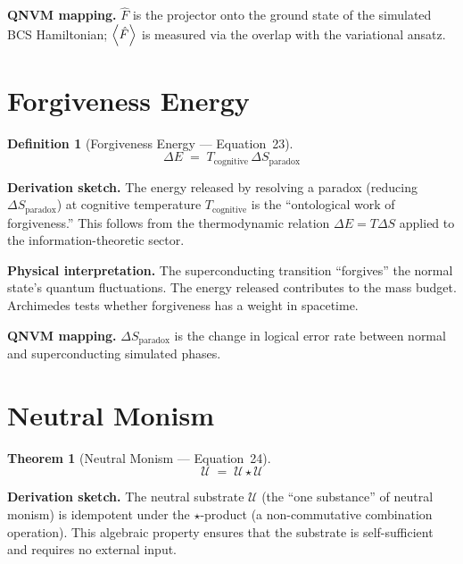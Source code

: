 \documentclass[11pt,a4paper]{article}
\newtheorem{definition}{Definition}[section]
\newtheorem{theorem}{Theorem}[section]
\theoremstyle{remark}
\newcommand{\Fop}{\hat{F}}
\newcommand{\CalU}{\mathcal{U}}
\begin{document}
\textbf{QNVM mapping.}\quad
$\Fop$ is the projector onto the ground state of the simulated BCS Hamiltonian; $\expval{\Fop}$ is measured via the overlap with the variational ansatz.

\section{Forgiveness Energy}
\label{sec:eq23}

\begin{definition}[Forgiveness Energy --- Equation~23]
\begin{equation}\label{eq:forgive}
    \Delta E \;=\; T_{\text{cognitive}}\, \Delta S_{\text{paradox}}
\end{equation}
\end{definition}

\textbf{Derivation sketch.}\quad
The energy released by resolving a paradox (reducing $\Delta S_{\text{paradox}}$) at cognitive temperature $T_{\text{cognitive}}$ is the ``ontological work of forgiveness.''  This follows from the thermodynamic relation $\Delta E = T\Delta S$ applied to the information-theoretic sector.

\textbf{Physical interpretation.}\quad
The superconducting transition ``forgives'' the normal state's quantum fluctuations.  The energy released contributes to the mass budget.  Archimedes tests whether forgiveness has a weight in spacetime.

\textbf{QNVM mapping.}\quad
$\Delta S_{\text{paradox}}$ is the change in logical error rate between normal and superconducting simulated phases.

\section{Neutral Monism}
\label{sec:eq24}

\begin{theorem}[Neutral Monism --- Equation~24]
\begin{equation}\label{eq:neutral}
    \CalU \;=\; \CalU \star \CalU
\end{equation}
\end{theorem}

\textbf{Derivation sketch.}\quad
The neutral substrate $\CalU$ (the ``one substance'' of neutral monism) is idempotent under the $\star$-product (a non-commutative combination operation).  This algebraic property ensures that the substrate is self-sufficient and requires no external input.
\end{document}
